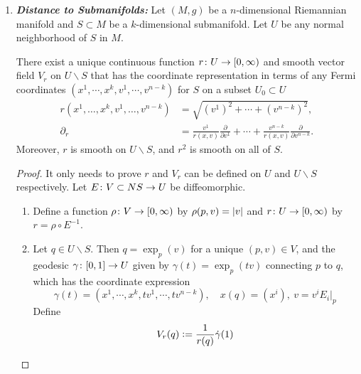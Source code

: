 \begin{enumerate}[label=\arabic{*}.]
 	\item \emph{\textbf{Distance to Submanifolds:}} Let $(M,g)$ be a $n$-dimensional Riemannian manifold and $S \subset M$ be a $k$-dimensional submanifold. Let $U$ be any normal neighborhood of $S$ in $M$.
 	\begin{prop}
 	    There exist a unique continuous function $r \colon U \rightarrow [0,\infty)$ and smooth vector field $V_r$ on $U \backslash S$ that has the coordinate representation in terms of any Fermi coordinates $(x^1,\cdots,x^k,v^1,\cdots,v^{n-k})$ for $S$ on a subset $U_0 \subset U$
 	    \begin{equation*}
 	        \begin{aligned}
				r\left(x^1, \ldots, x^k, v^1, \ldots, v^{n-k}\right) & =\sqrt{\left(v^1\right)^2+\cdots+\left(v^{n-k}\right)^2}, \\
				\partial_r & =\frac{v^1}{r(x, v)} \frac{\partial}{\partial v^1}+\cdots+\frac{v^{n-k}}{r(x, v)} \frac{\partial}{\partial v^{n-k}} .
			\end{aligned}
 	    \end{equation*}
 	    Moreover, $r$ is smooth on $U \backslash S$, and $r^2$ is smooth on all of $S$.
 	\end{prop}
 	\begin{proof}
 	    It only needs to prove $r$ and $V_r$ can be defined on $U$ and $U \backslash S$ respectively. Let $E \colon V \subset NS \rightarrow U$ be diffeomorphic.
 	    \begin{enumerate}[label=(\roman*)]
 	    	\item Define a function $\rho \colon V \rightarrow [0,\infty)$ by $\rho(p,v) = \left\lvert v\right\lvert$ and $r \colon U \rightarrow [0,\infty)$ by $r = \rho \circ E^{-1}$.
 	    	\item Let $q \in U \backslash S$. Then $q = \exp_p(v)$ for a unique $(p,v) \in V$, and the geodesic $\gamma \colon [0,1] \rightarrow U$ given by $\gamma(t) = \exp_p(tv)$ connecting $p$ to $q$, which has the coordinate expression
 	    	\begin{equation*}
 	    	    \gamma(t) = (x^1,\cdots,x^k,tv^1,\cdots,tv^{n-k}),\quad x(q)= (x^i),~v = v^iE_i|_{p}
 	    	\end{equation*}
 	    	Define
 	    	\begin{equation*}
 	    	    V_r(q) \vcentcolon= \frac{1}{r(q)}\dot{\gamma}(1) \qedhere
 	    	\end{equation*}
 	    \end{enumerate}
 	\end{proof}


\end{enumerate}
